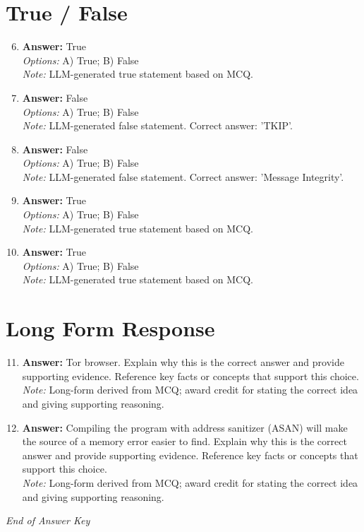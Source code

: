 \documentclass[12pt]{article}
\begin{document}
\section*{True / False}
\begin{enumerate}[label=\arabic*.]
\setcounter{enumi}{5}
\item \textbf{Answer:} True
\\ \textit{Options:} A) True; B) False
\\ \textit{Note:} LLM-generated true statement based on MCQ.
\item \textbf{Answer:} False
\\ \textit{Options:} A) True; B) False
\\ \textit{Note:} LLM-generated false statement. Correct answer: 'TKIP'.
\item \textbf{Answer:} False
\\ \textit{Options:} A) True; B) False
\\ \textit{Note:} LLM-generated false statement. Correct answer: 'Message Integrity'.
\item \textbf{Answer:} True
\\ \textit{Options:} A) True; B) False
\\ \textit{Note:} LLM-generated true statement based on MCQ.
\item \textbf{Answer:} True
\\ \textit{Options:} A) True; B) False
\\ \textit{Note:} LLM-generated true statement based on MCQ.
\end{enumerate}

\section*{Long Form Response}
\begin{enumerate}[label=\arabic*.]
\setcounter{enumi}{10}
\item \textbf{Answer:} Tor browser. Explain why this is the correct answer and provide supporting evidence. Reference key facts or concepts that support this choice.
\\ \textit{Note:} Long-form derived from MCQ; award credit for stating the correct idea and giving supporting reasoning.
\item \textbf{Answer:} Compiling the program with address sanitizer (ASAN) will make the source of a memory error easier to find. Explain why this is the correct answer and provide supporting evidence. Reference key facts or concepts that support this choice.
\\ \textit{Note:} Long-form derived from MCQ; award credit for stating the correct idea and giving supporting reasoning.
\end{enumerate}

\vfill
\noindent\textit{End of Answer Key}
\end{document}

